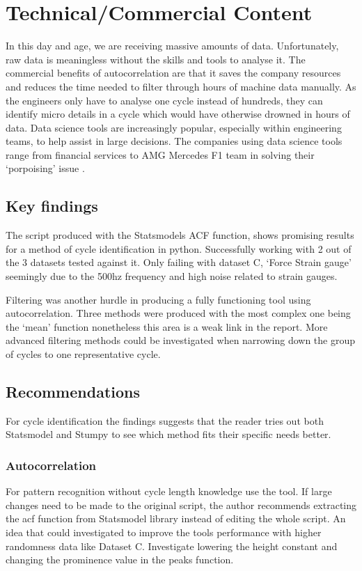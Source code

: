 \section{Technical/Commercial Content}
In this day and age, we are receiving massive amounts of data. Unfortunately, raw data is meaningless without the skills and tools to analyse it.
The commercial benefits of autocorrelation are that it saves the company resources and reduces the time needed to filter through hours of machine data manually. As the engineers only have to analyse one cycle instead of hundreds, they can identify micro details in a cycle which would have otherwise drowned in hours of data. Data science tools are increasingly popular, especially within engineering teams, to help assist in large decisions. The companies using data science tools range from financial services to AMG Mercedes F1 team in solving their `porpoising' issue \cite{mercedes}. 
\subsection{Key findings}
The script produced with the Statsmodels ACF function, shows promising results for a method of cycle identification in python. Successfully working with 2 out of the 3 datasets tested against it. Only failing with dataset C, `Force Strain gauge' seemingly due to the 500hz frequency and high noise related to strain gauges.

Filtering was another hurdle in producing a fully functioning tool using autocorrelation. Three methods were produced with the most complex one being the `mean' function nonetheless this area is a weak link in the report. More advanced filtering methods could be investigated when narrowing down the group of cycles to one representative cycle. 

\subsection{Recommendations}
For cycle identification the findings suggests that the reader tries out both Statsmodel and Stumpy to see which method fits their specific needs better. 
\subsubsection{Autocorrelation}
For pattern recognition without cycle length knowledge use the tool. If large changes need to be made to the original script, the author recommends extracting the acf function from Statsmodel library instead of editing the whole script. 
An idea that could investigated to improve the tools performance with higher randomness data like Dataset C. Investigate lowering the height constant and changing the prominence value in the peaks function. 

